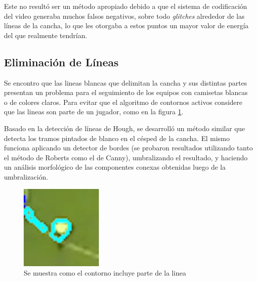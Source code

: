 Este no resultó ser un método apropiado debido a que el sistema de codificación
del video generaba muchos falsos negativos, sobre todo \textit{glitches}
alrededor de las líneas de la cancha, lo que les otorgaba a estos puntos un
mayor valor de energía del que realmente tendrían.


\subsection{Eliminación de Líneas}

Se encontro que las lineas blancas que delimitan la cancha y sus distintas partes
presentan un problema para el seguimiento de los equipos con camisetas blancas o de
colores claros. Para evitar que el algoritmo de contornos activos considere que las
lineas son parte de un jugador, como en la figura \ref{fig:confusion-linea}.

Basado en la detección de líneas de Hough, se desarrolló un método similar que
detecta los tramos pintados de blanco en el césped de la cancha. El mismo
funciona aplicando un detector de bordes (se probaron resultados utilizando
tanto el método de Roberts como el de Canny), umbralizando el resultado, y
haciendo un análisis morfológico de las componentes conexas obtenidas luego de
la umbralización.

\begin{figure}[H]
  \centering
    \begin{minipage}[t]{.45\textwidth}
      \includegraphics[width=\linewidth]{./images/confusion-linea.png}
      \caption{Se muestra como el contorno incluye parte de la linea
      \label{fig:confusion-linea}}
    \end{minipage}
\end{figure}

